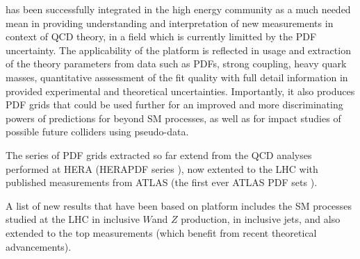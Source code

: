 \fitter has been successfully integrated in the high energy community as a much needed mean in providing understanding and interpretation of new measurements in context of QCD theory, in a field which is currently limitted by the PDF uncertainty.  
The applicability of the \fitter platform is reflected in usage and extraction of the theory parameters from data such as PDFs, strong coupling, heavy quark masses, quantitative asssessment of the fit quality with full detail information in provided experimental and theoretical uncertainties.
Importantly, it also produces PDF grids that could be used further for an improved and more discriminating powers of predictions for beyond SM processes, as well as for impact studies of possible future colliders using pseudo-data.

The series of PDF grids extracted so far extend from the QCD analyses performed at HERA (HERAPDF series \cite{HERAPDFs}), now extented to the LHC with published measurements from ATLAS (the first ever ATLAS PDF sets \cite{ATLASgrids}).

A list of new results that have been based on \fitter  platform includes the SM processes studied at the LHC in inclusive  $W$and $Z$ production, in inclusive jets, and also extended to the top measurements (which benefit from recent theoretical advancements).

